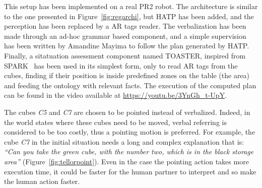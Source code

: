 \documentclass[a4paper,11pt,twoside]{StyleThese}
\begin{document}
This setup has been implemented on a real PR2 robot. The architecture is similar to the one presented in Figure~\ref{fig:regarchi}, but HATP has been added, and the perception has been replaced by a AR tags reader. The verbalization has been made through an ad-hoc grammar based component, and a simple supervision has been written by Amandine Mayima to follow the plan generated by HATP. Finally, a sitatuation assessment component named TOASTER, inspired from SPARK~\cite{milliez2014framework} has been used in its simplest form, only to read AR tags from the cubes, finding if their position is inside predefined   zones on the table (the area) and feeding the ontology with relevant facts. The execution of the computed plan can be found in the video available at \url{https://youtu.be/3YnGh\_t-UpY}. 

The cubes \textit{C5} and \textit{C7} are chosen to be pointed instead of verbalized. Indeed, in the world states where these cubes need to be moved, verbal referring is considered to be too costly, thus a pointing motion is preferred. For example, the cube \textit{C7} in the initial situation needs a long and complex explanation that is: \textit{``Can you take the green cube, with the number two, which is in the black storage area''} (Figure~\ref{fig:tellorpoint}). Even in the case the pointing action takes more execution time, it could be faster for the human partner to interpret and so make the human action faster.
\end{document}
